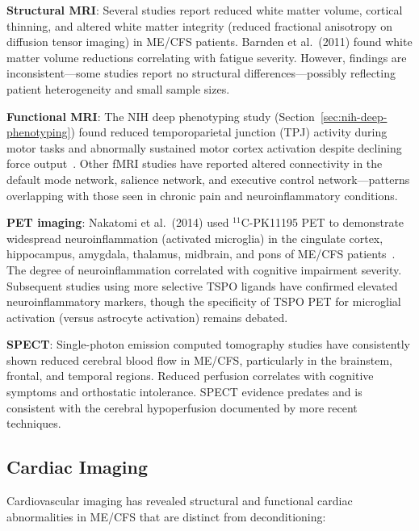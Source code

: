 \textbf{Structural MRI}: Several studies report reduced white matter volume, cortical thinning, and altered white matter integrity (reduced fractional anisotropy on diffusion tensor imaging) in ME/CFS patients. Barnden et al.\ (2011) found white matter volume reductions correlating with fatigue severity. However, findings are inconsistent---some studies report no structural differences---possibly reflecting patient heterogeneity and small sample sizes.

\textbf{Functional MRI}: The NIH deep phenotyping study (Section~\ref{sec:nih-deep-phenotyping}) found reduced temporoparietal junction (TPJ) activity during motor tasks and abnormally sustained motor cortex activation despite declining force output~\cite{walitt2024deep}. Other fMRI studies have reported altered connectivity in the default mode network, salience network, and executive control network---patterns overlapping with those seen in chronic pain and neuroinflammatory conditions.

\textbf{PET imaging}: Nakatomi et al.\ (2014) used $^{11}$C-PK11195 PET to demonstrate widespread neuroinflammation (activated microglia) in the cingulate cortex, hippocampus, amygdala, thalamus, midbrain, and pons of ME/CFS patients~\cite{Nakatomi2014neuroinflammation}. The degree of neuroinflammation correlated with cognitive impairment severity. Subsequent studies using more selective TSPO ligands have confirmed elevated neuroinflammatory markers, though the specificity of TSPO PET for microglial activation (versus astrocyte activation) remains debated.

\textbf{SPECT}: Single-photon emission computed tomography studies have consistently shown reduced cerebral blood flow in ME/CFS, particularly in the brainstem, frontal, and temporal regions. Reduced perfusion correlates with cognitive symptoms and orthostatic intolerance. SPECT evidence predates and is consistent with the cerebral hypoperfusion documented by more recent techniques.

\subsection{Cardiac Imaging}

Cardiovascular imaging has revealed structural and functional cardiac abnormalities in ME/CFS that are distinct from deconditioning:

